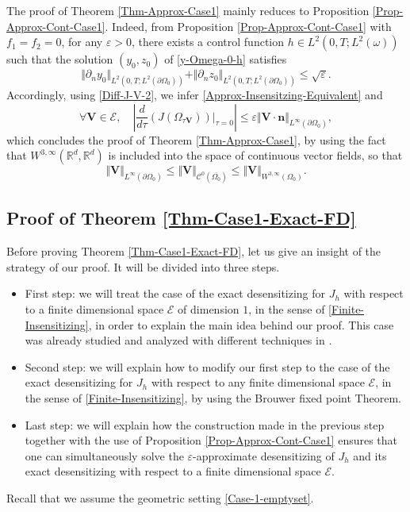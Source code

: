 \documentclass[JEP,XML,SOM,Unicode,NoFloatCountersInSection]{cedram}
\newcommand{\bn}{\boldsymbol{n}}
\newcommand{\bV}{\boldsymbol{V}}
\newcommand\R{{\mathbb R}}
\newcommand{\norm}[1]{\Vert#1\Vert}
\theoremstyle{definition}
\begin{document}
The proof of Theorem \ref{Thm-Approx-Case1} mainly reduces to Proposition \ref{Prop-Approx-Cont-Case1}. Indeed, from Proposition \ref{Prop-Approx-Cont-Case1} with $f_1=f_2=0$, for any $\varepsilon >0$, there exists a control function $h \in L^2(0,T; L^2(\omega))$ such that the solution $(y_0,z_0)$ of \eqref{y-Omega-0-h} satisfies
\begin{equation}
\label{Small-Neumann-Data}
\norm{\partial_n y_0}_{L^2(0,T;L^2(\partial\Omega_0))} + \norm{\partial_n z_0}_{L^2(0,T;L^2(\partial\Omega_0))}\leq \sqrt{\varepsilon}.
\end{equation}
Accordingly, using \eqref{Diff-J-V-2}, we infer {\eqref{Approx-Insensitzing-Equivalent} and}
\[
\forall \bV \in \mathcal{E},\quad \left| \dfrac{d }{d \tau}\left({J}\left(\Omega_{\tau\bV} \right)\right)\Big|_{\tau=0}\right|
\leq \varepsilon\norm{\bV\cdot \bn}_{L^\infty(\partial \Omega_0)},
\]
which concludes the proof of Theorem \ref{Thm-Approx-Case1}, by using the fact that $W^{3,\infty}(\R^d,\R^d)$ is included into the space of continuous vector fields, so that
\[
\Vert \bV\Vert_{L^\infty(\partial\Omega_0)}\leq \Vert \bV\Vert_{\mathscr{C}^0(\overline{\Omega_0})}\leq \Vert \bV\Vert_{W^{3,\infty}(\Omega_0)}.
\]

\subsection{Proof of Theorem \ref{Thm-Case1-Exact-FD}}\label{Subsec-Proof-Exact-Case1}
Before proving Theorem \ref{Thm-Case1-Exact-FD}, let us give an insight of the strategy of our proof. It will be divided into three steps.
\begin{itemize}
\item First step: we will treat the case of the exact {desensitizing} for $J_h$ with respect to a finite dimensional space $\mathcal E$ of dimension $1$, in the sense of \eqref{Finite-Insensitizing}, in order to explain the main idea behind our proof. This case was already studied and analyzed with different techniques in \cite{Lissy-Privat-Simpore}.
\item Second step: we will explain how to modify our first step to the case of the exact {desensitizing} for $J_h$ with respect to any finite dimensional space $\mathcal E$, in the sense of \eqref{Finite-Insensitizing}, by using the Brouwer fixed point Theorem.
\item Last step: we will explain how the construction made in the previous step together with the use of Proposition \ref{Prop-Approx-Cont-Case1} ensures that {one can simultaneously solve the $\varepsilon$-approximate desensitizing of $J_h$ and its exact desensitizing with respect to a finite dimensional space $\mathcal{E}$.}
\end{itemize}
Recall that we assume the geometric setting \eqref{Case-1-emptyset}.
\end{document}
